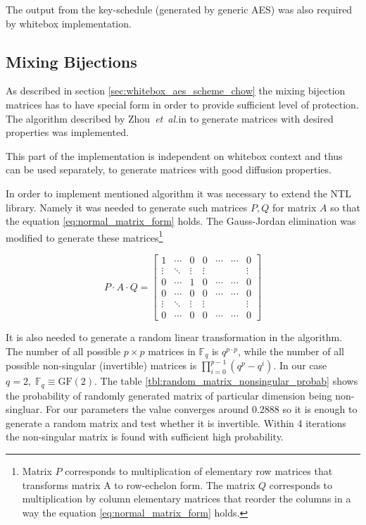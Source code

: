 \documentclass[11pt,oneside,final]{fithesis2}
\newcommand{\gf}{\ensuremath{\text{GF}\left(2\right)}}
\newcommand{\eal}{\emph{et~al.}}
\begin{document}
    The output from the key-schedule (generated by generic AES) was also required by whitebox implementation.
    
    \subsection{Mixing Bijections}
    As described in section \ref{sec:whitebox_aes_scheme_chow} the mixing bijection matrices has to have special form in order to provide sufficient 
    level of protection. The algorithm described by Zhou~\eal in \citep{journals/iacr/XiaoZ02} to generate matrices with desired properties was implemented.
    
    This part of the implementation is independent on whitebox context and thus can be used separately, to generate matrices with good diffusion properties.
    
    In order to implement mentioned algorithm it was necessary to extend the NTL library. Namely it was needed to generate such matrices $P, Q$ for matrix $A$
    so that the equation \ref{eq:normal_matrix_form} holds. The Gauss-Jordan elimination was modified to generate these matrices\footnote{Matrix $P$ corresponds to multiplication of 
    elementary row matrices that transforms matrix A to row-echelon form. The matrix $Q$ corresponds to multiplication by column elementary matrices that
    reorder the columns in a way the equation \ref{eq:normal_matrix_form} holds.}

    \begin{equation}\label{eq:normal_matrix_form}
	P \cdot A \cdot Q = 
	\begin{bmatrix}
	    1      & \cdots & 0      & 0      & \cdots & \cdots & 0      \\
	    \vdots & \ddots & \vdots & \vdots &        &        & \vdots \\ 
	    0      & \cdots & 1      & 0      & \cdots & \cdots & 0      \\
	    0      & \cdots & 0      & 0      & \cdots & \cdots & 0      \\
	    \vdots & \ddots & \vdots & \vdots &        &        & \vdots \\ 
	    0      & \cdots & 0      & 0      & \cdots & \cdots & 0      
	\end{bmatrix}
    \end{equation}
    
    It is also needed to generate a random linear transformation in the algorithm. The number of all possible $p \times p$ matrices 
    in $\mathbb{F}_q$ is $q^{p\cdot p}$, while the number of all possible non-singular (invertible) matrices is $\prod_{i=0}^{p-1}(q^p - q^i)$.
    In our case $q=2, \; \mathbb{F}_q \equiv \gf$. The table \ref{tbl:random_matrix_nonsingular_probab} shows the probability of randomly generated matrix of particular 
    dimension being non-singluar. For our parameters the value converges around $0.2888$ so it is enough to generate a random matrix
    and test whether it is invertible. Within 4 iterations the non-singular matrix is found with sufficient high probability.
\end{document}
